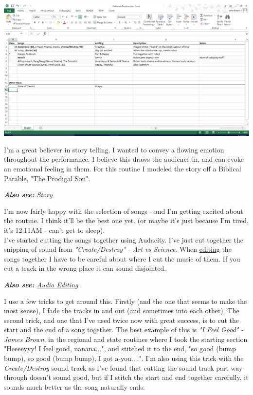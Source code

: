     		\centerline{\includegraphics[width=\linewidth]{images/Songs}}
    		\vspace{10pt}
    		
    		I'm a great believer in story telling. I wanted to convey a flowing emotion throughout the performance. I believe this draws the audience in, and can evoke an emotional feeling in them. For this routine I modeled the story off a Biblical Parable, "The Prodigal Son".
            
            \textit{\textbf{Also see: }\hyperref[Story]{Story}}
    		
    		I'm now fairly happy with the selection of songs - and I'm getting excited about the routine. I think it'll be the best one yet. (or maybe it's just because I'm tired, it's 12:11AM - can't get to sleep).\\
    		
    		I've started cutting the songs together using Audacity. I've just cut together the snipping of sound from \textit{"Create/Destroy" - Art vs Science}. When \hyperref[audio_editing]{editing} the songs together I have to be careful about where I cut the music of them. If you cut a track in the wrong place it can sound disjointed.\\
            
            
            \textit{\textbf{Also see: }\hyperref[audio_editing]{Audio Editing}}
    		
    		I use a few tricks to get around this. Firstly (and the one that seems to make the most sense), I fade the tracks in and out (and sometimes into each other). The second trick, and one that I've used twice now with great success, is to cut the start and the end of a song together. The best example of this is \textit{"I Feel Good" - James Brown}, in the regional and state routines where I took the starting section "Heeeeyyy! I feel good, nanana...", and stitched it to the end, "so good (bump bump), so good (bump bump), I got a-you....". I'm also using this trick with the \textit{Create/Destroy} sound track as I've found that cutting the sound track part way through doesn't sound good, but if I stitch the start and end together carefully, it sounds much better as the song naturally ends.\\
    		
